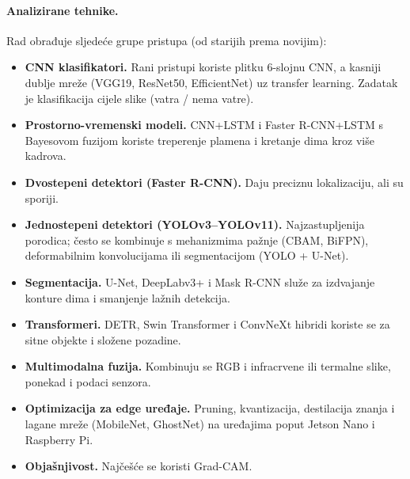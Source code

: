 \paragraph{Analizirane tehnike.} Rad obrađuje sljedeće grupe pristupa (od starijih prema novijim):
\begin{itemize}
  \item \textbf{CNN klasifikatori.} Rani pristupi koriste plitku 6-slojnu CNN, a kasniji dublje mreže (VGG19, ResNet50, EfficientNet) uz transfer learning. Zadatak je klasifikacija cijele slike (vatra / nema vatre).
  \item \textbf{Prostorno-vremenski modeli.} CNN+LSTM i Faster R-CNN+LSTM s Bayesovom fuzijom koriste treperenje plamena i kretanje dima kroz više kadrova.
  \item \textbf{Dvostepeni detektori (Faster R-CNN).} Daju preciznu lokalizaciju, ali su sporiji.
  \item \textbf{Jednostepeni detektori (YOLOv3--YOLOv11).} Najzastupljenija porodica; često se kombinuje s mehanizmima pažnje (CBAM, BiFPN), deformabilnim konvolucijama ili segmentacijom (YOLO + U-Net).
  \item \textbf{Segmentacija.} U-Net, DeepLabv3+ i Mask R-CNN služe za izdvajanje konture dima i smanjenje lažnih detekcija.
  \item \textbf{Transformeri.} DETR, Swin Transformer i ConvNeXt hibridi koriste se za sitne objekte i složene pozadine.
  \item \textbf{Multimodalna fuzija.} Kombinuju se RGB i infracrvene ili termalne slike, ponekad i podaci senzora.
  \item \textbf{Optimizacija za edge uređaje.} Pruning, kvantizacija, destilacija znanja i lagane mreže (MobileNet, GhostNet) na uređajima poput Jetson Nano i Raspberry Pi.
  \item \textbf{Objašnjivost.} Najčešće se koristi Grad-CAM.
\end{itemize}

